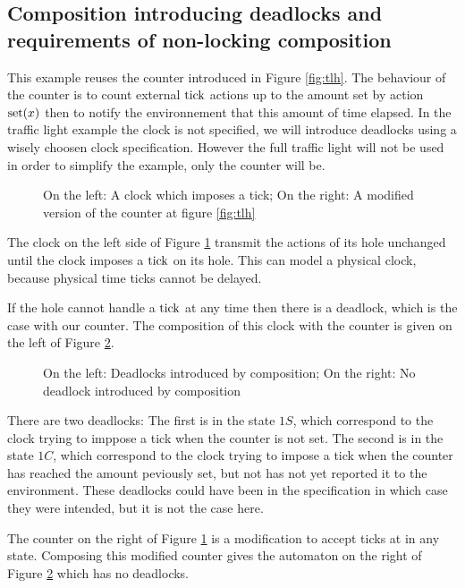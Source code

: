 \documentclass{article}
\begin{document}
\subsection{Composition introducing deadlocks and requirements of non-locking composition}\label{apx:lockcomp}
\begin{exi}
This example reuses the counter introduced in Figure \ref{fig:tlh}.
The behaviour of the counter is to count external \(\mathrm{tick}\) actions up to the amount set by action \(\mathrm{set}{\left(x\right)}\) then to notify the environnement that this amount of time elapsed.
In the traffic light example the clock is not specified, we will introduce deadlocks using a wisely choosen clock specification.
However the full traffic light will not be used in order to simplify the example, only the counter will be.

\begin{figure}

\vrule

\caption{On the left: A clock which imposes a tick; On the right: A modified version of the counter at figure \ref{fig:tlh}}
\label{fig:anytick}
\end{figure}
The clock on the left side of Figure \ref{fig:anytick} transmit the actions of its hole unchanged until the clock imposes a \(\mathrm{tick}\) on its hole.
This can model a physical clock, because physical time ticks cannot be delayed.

If the hole cannot handle a \(\mathrm{tick}\) at any time then there is a deadlock, which is the case with our counter.
The composition of this clock with the counter is given on the left of Figure \ref{fig:deadlock}.
\begin{figure}

\vrule

\caption{On the left: Deadlocks introduced by composition; On the right: No deadlock introduced by composition}
\label{fig:deadlock}
\end{figure}
There are two deadlocks:
The first is in the state \(1S\), which correspond to the clock trying to imppose a tick when the counter is not set.
The second is in the state \(1C\), which correspond to the clock trying to impose a tick when the counter has reached the amount peviously set, but not has not yet reported it to the environment.
These deadlocks could have been in the specification in which case they were intended, but it is not the case here.

The counter on the right of Figure \ref{fig:anytick} is a modification to accept ticks at in any state.
Composing this modified counter gives the automaton on the right of Figure \ref{fig:deadlock} which has no deadlocks.


\end{exi}
\end{document}
